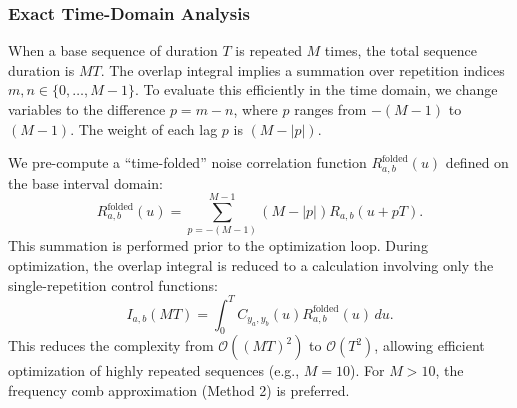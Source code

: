 \documentclass[%
 reprint,
superscriptaddress,
 amsmath,amssymb,
 aps,
pra,
floatfix,
]{revtex4-2}
\begin{document}
\subsubsection{Exact Time-Domain Analysis}
When a base sequence of duration $T$ is repeated $M$ times, the total sequence duration is $MT$. The overlap integral implies a summation over repetition indices $m, n \in \{0, \dots, M-1\}$. To evaluate this efficiently in the time domain, we change variables to the difference $p = m - n$, where $p$ ranges from $-(M-1)$ to $(M-1)$. The weight of each lag $p$ is $(M - |p|)$.

We pre-compute a ``time-folded'' noise correlation function $R^{\text{folded}}_{a,b}(u)$ defined on the base interval domain:
\begin{equation}
    R^{\text{folded}}_{a,b}(u) = \sum_{p=-(M-1)}^{M-1} (M - |p|) R_{a,b}(u + pT).
\end{equation}
This summation is performed prior to the optimization loop. During optimization, the overlap integral is reduced to a calculation involving only the single-repetition control functions:
\begin{equation}
    I_{a,b}(MT) = \int_{0}^{T} C_{y_a, y_b}(u) R^{\text{folded}}_{a,b}(u) \, du.
\end{equation}
This reduces the complexity from $\mathcal{O}((MT)^2)$ to $\mathcal{O}(T^2)$, allowing efficient optimization of highly repeated sequences (e.g., $M=10$). For $M > 10$, the frequency comb approximation (Method 2) is preferred.
\end{document}
